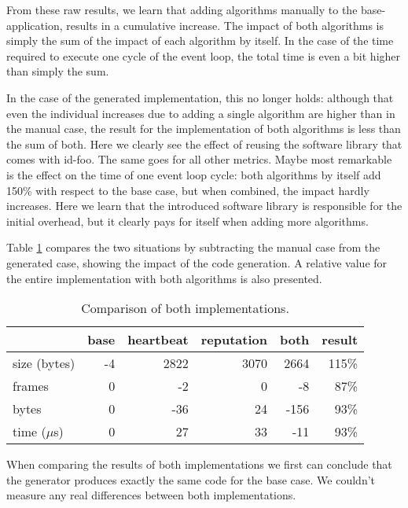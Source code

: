 \documentclass[conference]{IEEEtran}
\newcommand{\NAME}{id-foo\xspace}
\begin{document}
From these raw results, we learn that adding algorithms manually to the
base-application, results in a cumulative increase. The impact of both
algorithms is simply the sum of the impact of each algorithm by itself. In the
case of the time required to execute one cycle of the event loop, the total
time is even a bit higher than simply the sum.

In the case of the generated implementation, this no longer holds: although
that even the individual increases due to adding a single algorithm are higher
than in the manual case, the result for the implementation of both algorithms
is less than the sum of both. Here we clearly see the effect of reusing the
software library that comes with \NAME. The same goes for all other metrics.
Maybe most remarkable is the effect on the time of one event loop cycle: both
algorithms by itself add 150\% with respect to the base case, but when
combined, the impact hardly increases. Here we learn that the introduced
software library is responsible for the initial overhead, but it clearly pays
for itself when adding more algorithms.

Table \ref{tbl:summary} compares the two situations by subtracting the manual
case from the generated case, showing the impact of the code generation. A
relative value for the entire implementation with both algorithms is also
presented.

\begin{table}[H]
  \centering
  \begin{tabular}{lrrrrr}
  \hline
                & base & heartbeat & reputation & both  & result \\
  \hline
  size (bytes)  & -4    & 2822     & 3070       & 2664  & 115\%  \\
  frames        & 0     & -2       & 0          & -8    & 87\%   \\
  bytes         & 0     & -36      & 24         & -156  & 93\%   \\
  time ($\mu$s) & 0     & 27       & 33         & -11   & 93\%   \\
  \hline
  \end{tabular}
  \caption{Comparison of both implementations.}
  \label{tbl:summary}
\end{table}

When comparing the results of both implementations we first can conclude that
the generator produces exactly the same code for the base case. We couldn't
measure any real differences between both implementations.
\end{document}
